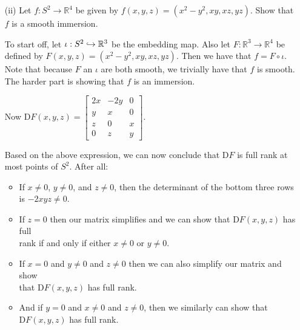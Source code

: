 \documentclass{book}
\renewcommand{\hookrightarrow}{\lhook\joinrel\rightarrow}
\newcommand{\HexOne}{%
   \color{Purple}%
   \fontsize{12}{13}\selectfont%
}
\newenvironment{myIndent}{%
   \begin{adjustwidth}{2.5em}{0em}%
}{%
   \end{adjustwidth}%
}
\newcommand{\Df}{\mathrm{D}}
\newcommand{\retTwo}{\hfill\bigbreak}
\begin{document}
\begin{enumerate}
\begin{myIndent}
\begin{myIndent}
			Since $\frac{1 - y^2}{(1 - x^2 - y^2)^{3/2}} \neq 0$ ever, we can thus conclude that $\Df \widehat{q}(x, y)$ is singular iff:
			
			{\centering$\begin{bmatrix} 1 - y^2 & xy \\ xy & 1 - x^2\end{bmatrix}$ is singular.\retTwo\par}

			This happens iff $0 = (1 - y^2)(1 - x^2) - x^2 y^2 = 1 - x^2 - y^2$. Yet the latter never happens for all $(x, y) \in B_1(0)$.\retTwo
		\end{myIndent}
	\end{myIndent}

	\item[(ii)] Let $f: S^2 \to \mathbb{R}^4$ be given by $f(x, y, z) = (x^2 - y^2, xy, xz, yz)$. Show that $f$ is a smooth immersion.
	\begin{myIndent}\HexOne
		To start off, let $\iota: S^2 \hookrightarrow \mathbb{R}^3$ be the embedding map. Also let $F: \mathbb{R}^3 \to \mathbb{R}^4$ be defined by $F(x, y, z) =(x^2 - y^2, xy, xz, yz)$. Then we have that $f = F \circ \iota$. Note that because $F$ an $\iota$ are both smooth, we trivially have that $f$ is smooth. The harder part is showing that $f$ is an immersion.\retTwo

		Now $\Df F(x, y, z) = \begin{bmatrix} 2x & -2y & 0 \\ y & x & 0 \\ z & 0 & x \\ 0 & z & y\end{bmatrix}$.\retTwo

		Based on the above expression, we can now conclude that $\Df F$ is full rank at most points of $S^2$. After all:
		\begin{itemize}
			\item If $x \neq 0$, $y \neq 0$, and $z \neq 0$, then the determinant of the bottom three rows\\ is $-2xyz \neq 0$. 
			\item If $z = 0$ then our matrix simplifies and we can show that $\Df F(x, y, z)$ has full\\ rank if and only if either $x \neq 0$ or $y \neq 0$.
			\item If $x = 0$ and $y \neq 0$ and $z \neq 0$ then we can also simplify our matrix and show\\ that $\Df F(x, y, z)$ has full rank.
			\item And if $y = 0$ and $x \neq 0$ and $z \neq 0$, then we similarly can show that\\ $\Df F(x, y, z)$ has full rank.\retTwo
		\end{itemize}


\end{myIndent}
\end{enumerate}
\end{document}
